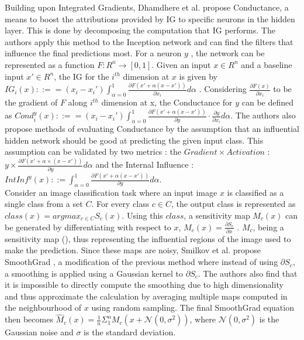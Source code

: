 Building upon Integrated Gradients, Dhamdhere et al. propose \cite{dhamdhereHowImportantNeuron2018} Conductance, a means to boost the attributions provided by IG to specific neurons in the hidden layer. This is done by decomposing the computation that IG performs. The authors apply this method to the Inception network \cite{szegedyGoingDeeperConvolutions2014} and can find the filters that influence the final predictions most. 
For a neuron $y$ , the network can be represented as a function $F:R^{n} \rightarrow [0,1]$. Given an input $x \in R^{n}$ and a baseline input $x' \in R^{n}$, the IG for the $i^{th}$ dimension at $x$ is given by $IG_{i}(x) ::== (x_{i}- x_{i}') \int_{\alpha=0}^{1} \frac{\partial F(x' + \alpha(x-x'))}{\partial x_{i}}d \alpha$ . Considering $\frac{\partial F(x)}{\partial x_{i}}$ to be the gradient of $F$ along $i^{th}$ dimension at x, the Conductance for $y$ can be defined as $
Cond_{i}^{y}(x) ::== (x_{i}- x_{i}') \int_{\alpha=0}^{1} \frac{\partial F(x' + \alpha(x-x'))}{\partial y} \cdot \frac{\partial y}{\partial x_{i}} d \alpha$. The authors also propose methods of evaluating Conductance by the assumption that an influential hidden network should be good at predicting the given input class. This assumption can be validated by two metrics : the $Gradient\times Activation$ : $
y \times \frac{\partial F(x' + \alpha \times (x-x'))}{\partial y} d \alpha$ and the Internal Influence : $
IntInf ^{y}(x) ::= \int^{1}_{\alpha=0} \frac{\partial F(x' + \alpha(x-x'))}{\partial y} d \alpha$.\\

Consider an image classification task where an input image $x$ is classified as a single class from a set $C$. For every class $c \in C$, the output class is represented as $class(x) = argmax_{c \in C}S_{c}(x)$. Using this $class$, a sensitivity map $M_{c}(x)$ can be generated by differentiating with respect to $x$, $M_{c}(x) = \frac{\partial S_{c}}{\partial x}$ . $M_{c}$, being a sensitivity map (\cite{simonyanDeepConvolutionalNetworks2014}), thus representing the influential regions of the image used to make the prediction. Since these maps are noisy, Smilkov et al. propose SmoothGrad \cite{smilkovSmoothGradRemovingNoise2017}, a modification of the previous method where instead of using $\partial S_{c}$, a smoothing is applied using a Gaussian kernel to $\partial S_{c}$. The authors also find that it is impossible to directly compute the smoothing due to high dimensionality and thus approximate the calculation by averaging multiple maps computed in the neighbourhood of $x$ using random sampling. The final SmoothGrad equation then becomes $\hat M_{c}(x) = \frac{1}{n}\Sigma_{1}^{n}M_{c}(x + \mathcal{N}(0, \sigma^{2}))$, where $\mathcal{N}(0, \sigma^{2})$ is the Gaussian noise and $\sigma$ is the standard deviation.

